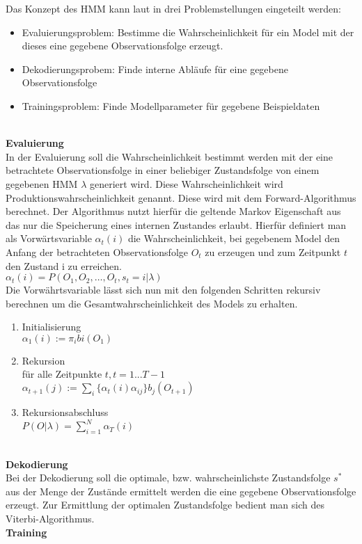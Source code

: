 Das Konzept des \acl{HMM} kann laut \cite{rabiner} in drei Problemstellungen eingeteilt werden:
\begin{itemize}
  \item Evaluierungsproblem: Bestimme die Wahrscheinlichkeit für ein Model mit
  der dieses eine gegebene Observationsfolge erzeugt.
  \item Dekodierungsprobem: Finde interne Abläufe für eine gegebene Observationsfolge
  \item Trainingsproblem: Finde Modellparameter für gegebene Beispieldaten
\end{itemize}
\\
\textbf{Evaluierung} \\
In der Evaluierung soll die Wahrscheinlichkeit bestimmt werden mit der eine
betrachtete Observationsfolge in einer beliebiger Zustandsfolge von einem
gegebenen \acl{HMM} \(\lambda\) generiert wird. Diese Wahrscheinlichkeit wird
Produktionswahrscheinlichkeit genannt. Diese wird mit dem Forward-Algorithmus
berechnet. Der Algorithmus nutzt hierfür die geltende Markov Eigenschaft
aus das nur die Speicherung eines internen Zustandes erlaubt. Hierfür definiert
man als Vorwärtsvariable \(\alpha_{t}(i)\) die Wahrscheinlichkeit, bei
gegebenem Model \lampda den Anfang der betrachteten Observationsfolge \(O_{t}\)
zu erzeugen und zum Zeitpunkt \(t\) den Zustand i zu erreichen.\\
\( \alpha_{t}(i) = P(O_{1},O_{2},\ldots,O_{t},s_{t}=i|\lambda) \)\\
Die Vorwährtsvariable lässt sich nun mit den folgenden Schritten rekursiv
berechnen um die Gesamtwahrscheinlichkeit des Models zu erhalten.
\begin{enumerate}
  \item Initialisierung\\
		$\alpha_{1}(i) := \pi_{i}b{i}(O_{1})$
  \item Rekursion\\
	für alle Zeitpunkte \(t, t=1...T-1\)\\
	\(\alpha_{t+1}(j) :=
	\sum\limits_{i}\{\alpha_{t}(i)\alpha_{ij}\}b_{j}(O_{t+1})\)
  \item Rekursionsabschluss\\
  	\(P(O|\lambda) = \sum\limits_{i=1}^N \alpha_{T}(i)\)
\end{enumerate}

\\
\textbf{Dekodierung} \\
Bei der Dekodierung soll die optimale, bzw. wahrscheinlichste Zustandsfolge
\(s^*\) aus der Menge der Zustände ermittelt werden die eine gegebene
Observationsfolge erzeugt. Zur Ermittlung der optimalen Zustandsfolge bedient
man sich des Viterbi-Algorithmus.
\\
\textbf{Training} \\

